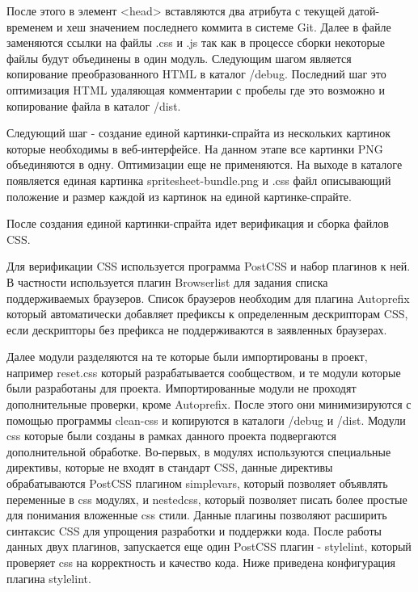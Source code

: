 После этого в элемент <head> вставляются два атрибута с текущей датой-временем и хеш значением последнего коммита в системе Git. Далее в файле заменяются ссылки на файлы .css и .js так как в процессе сборки некоторые файлы будут объединены в один модуль. Следующим шагом является копирование преобразованного HTML в каталог /debug. Последний шаг это оптимизация HTML удаляющая комментарии с пробелы где это возможно и копирование файла в каталог /dist. 

Следующий шаг - создание единой картинки-спрайта из нескольких картинок которые необходимы в веб-интерфейсе. На данном этапе все картинки PNG объединяются в одну. Оптимизации еще не применяются.
На выходе в каталоге появляется единая картинка spritesheet-bundle.png и .css файл описывающий положение и размер каждой из картинок на единой картинке-спрайте.

После создания единой картинки-спрайта идет верификация и сборка файлов CSS.  

Для верификации CSS используется программа PostCSS и набор плагинов к ней. В частности используется плагин Browserlist для задания списка поддерживаемых браузеров. Список браузеров необходим для плагина Autoprefix который автоматически добавляет префиксы к определенным дескрипторам CSS, если дескрипторы без префикса не поддерживаются в заявленных браузерах.

Далее модули разделяются на те которые были импортированы в проект, например reset.css который разрабатывается сообществом, и те модули которые были разработаны для проекта. Импортированные модули не проходят дополнительные проверки, кроме Autoprefix. После этого они минимизируются с помощью программы clean-css и копируются в каталоги /debug и /dist.
Модули css которые были созданы в рамках данного проекта подвергаются дополнительной обработке. Во-первых, в модулях используются специальные директивы, которые не входят в стандарт CSS, данные директивы обрабатываются PostCSS плагином simplevars, который позволяет объявлять переменные в css модулях, и nestedcss, который позволяет писать более простые для понимания вложенные css стили. Данные плагины позволяют расширить синтаксис CSS для упрощения разработки и поддержки кода. После работы данных двух плагинов, запускается еще один PostCSS плагин - stylelint, который проверяет css на корректность и качество кода. Ниже приведена конфигурация плагина stylelint.


